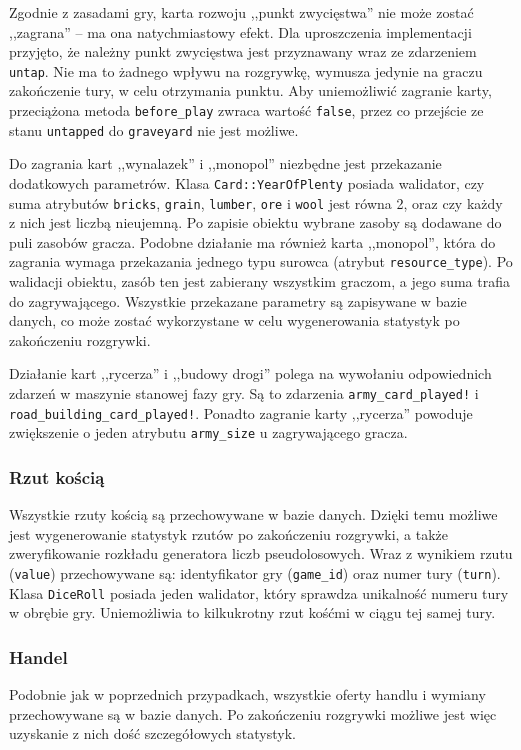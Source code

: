 \documentclass[a4paper,12pt]{article}
\begin{document}
Zgodnie z zasadami gry, karta rozwoju ,,punkt zwycięstwa'' nie może
zostać ,,zagrana'' -- ma ona natychmiastowy efekt. Dla uproszczenia
implementacji przyjęto, że należny punkt zwycięstwa jest przyznawany
wraz ze zdarzeniem \texttt{untap}. Nie ma to żadnego wpływu na
rozgrywkę, wymusza jedynie na graczu zakończenie tury, w celu
otrzymania punktu. Aby uniemożliwić zagranie karty, przeciążona metoda
\texttt{before\_play} zwraca wartość \texttt{false}, przez co
przejście ze stanu \texttt{untapped} do \texttt{graveyard} nie jest
możliwe.

Do zagrania kart ,,wynalazek'' i ,,monopol'' niezbędne jest
przekazanie dodatkowych parametrów. Klasa \texttt{Card::YearOfPlenty}
posiada walidator, czy suma atrybutów \texttt{bricks}, \texttt{grain},
\texttt{lumber}, \texttt{ore} i \texttt{wool} jest równa 2, oraz czy
każdy z nich jest liczbą nieujemną. Po zapisie obiektu wybrane zasoby
są dodawane do puli zasobów gracza. Podobne działanie ma również karta
,,monopol'', która do zagrania wymaga przekazania jednego typu surowca
(atrybut \texttt{resource\_type}). Po walidacji obiektu, zasób ten
jest zabierany wszystkim graczom, a jego suma trafia do
zagrywającego. Wszystkie przekazane parametry są zapisywane w bazie
danych, co może zostać wykorzystane w celu wygenerowania statystyk po
zakończeniu rozgrywki.

Działanie kart ,,rycerza'' i ,,budowy drogi'' polega na wywołaniu
odpowiednich zdarzeń w maszynie stanowej fazy gry. Są to zdarzenia
\texttt{army\_card\_played!} i
\texttt{road\_building\_card\_played!}. Ponadto zagranie karty
,,rycerza'' powoduje zwiększenie o jeden atrybutu \texttt{army\_size}
u zagrywającego gracza.

\subsubsection{Rzut kością}

Wszystkie rzuty kością są przechowywane w bazie danych. Dzięki temu
możliwe jest wygenerowanie statystyk rzutów po zakończeniu rozgrywki,
a także zweryfikowanie rozkładu generatora liczb pseudolosowych. Wraz
z wynikiem rzutu (\texttt{value}) przechowywane są: identyfikator gry
(\texttt{game\_id}) oraz numer tury (\texttt{turn}). Klasa
\texttt{DiceRoll} posiada jeden walidator, który sprawdza unikalność
numeru tury w obrębie gry. Uniemożliwia to kilkukrotny rzut kośćmi w
ciągu tej samej tury.

\subsubsection{Handel}
Podobnie jak w poprzednich przypadkach, wszystkie oferty handlu i
wymiany przechowywane są w bazie danych. Po zakończeniu rozgrywki
możliwe jest więc uzyskanie z nich dość szczegółowych
statystyk.
\end{document}
